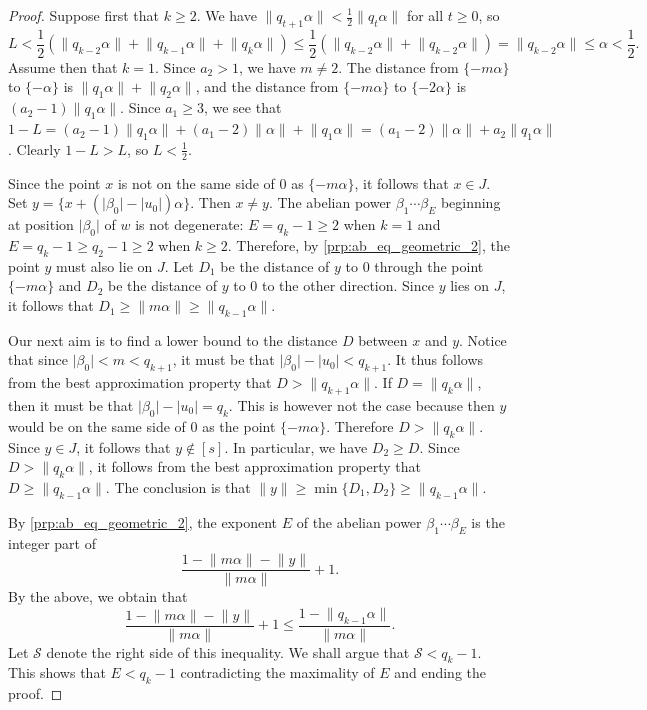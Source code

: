 \documentclass[a4paper,fleqn]{article}
\providecommand{\abs}[1]{\lvert#1\rvert}
\providecommand{\norm}[1]{\lVert#1\rVert}
\begin{document}
\begin{proof}
    Suppose first that $k \geq 2$. We have $\norm{q_{t+1}\alpha} < \tfrac12 \norm{q_t\alpha}$ for all $t \geq 0$, so
    \begin{equation*}
      L < \frac12(\norm{q_{k-2}\alpha} + \norm{q_{k-1}\alpha} + \norm{q_k\alpha}) \leq \frac12(\norm{q_{k-2}\alpha} + \norm{q_{k-2}\alpha}) = \norm{q_{k-2}\alpha} \leq \alpha < \frac12.
    \end{equation*}
    Assume then that $k = 1$. Since $a_2 > 1$, we have $m \neq 2$. The distance from $\{-m\alpha\}$ to $\{-\alpha\}$ is
    $\norm{q_1\alpha} + \norm{q_2\alpha}$, and the distance from $\{-m\alpha\}$ to $\{-2\alpha\}$ is
    $(a_2 - 1)\norm{q_1\alpha}$. Since $a_1 \geq 3$, we see that
    $1 - L = (a_2 - 1)\norm{q_1\alpha} + (a_1 - 2)\norm{\alpha} + \norm{q_1\alpha} = (a_1 - 2)\norm{\alpha} + a_2 \norm{q_1\alpha}$.
    Clearly $1 - L > L$, so $L < \tfrac12$.

    Since the point $x$ is not on the same side of $0$ as $\{-m\alpha\}$, it follows that $x \in J$. Set
    $y = \{x + (\abs{\beta_0} - \abs{u_0})\alpha\}$. Then $x \neq y$. The abelian power $\beta_1 \dotsm \beta_E$
    beginning at position $\abs{\beta_0}$ of $w$ is not degenerate: $E = q_k - 1 \geq 2$ when $k = 1$ and
    $E = q_k - 1 \geq q_2 - 1 \geq 2$ when $k \geq 2$. Therefore, by \autoref{prp:ab_eq_geometric_2}, the point $y$
    must also lie on $J$. Let $D_1$ be the distance of $y$ to $0$ through the point $\{-m\alpha\}$ and $D_2$ be the
    distance of $y$ to $0$ to the other direction. Since $y$ lies on $J$, it follows that
    $D_1 \geq \norm{m\alpha} \geq \norm{q_{k-1}\alpha}$.
    
    Our next aim is to find a lower bound to the distance $D$ between $x$ and $y$. Notice that since
    $\abs{\beta_0} < m < q_{k+1}$, it must be that $\abs{\beta_0} - \abs{u_0} < q_{k+1}$. It thus follows from the best
    approximation property that $D > \norm{q_{k+1}\alpha}$. If $D = \norm{q_k\alpha}$, then it must be that
    $\abs{\beta_0} - \abs{u_0} = q_k$. This is however not the case because then $y$ would be on the same side of
    $0$ as the point $\{-m\alpha\}$. Therefore $D > \norm{q_k\alpha}$. Since $y \in J$, it follows that $y \notin [s]$.
    In particular, we have $D_2 \geq D$. Since $D > \norm{q_k\alpha}$, it follows from the best approximation
    property that $D \geq \norm{q_{k-1}\alpha}$. The conclusion is that
    $\norm{y} \geq \min\{D_1, D_2\} \geq \norm{q_{k-1}\alpha}$.

    By \autoref{prp:ab_eq_geometric_2}, the exponent $E$ of the abelian power $\beta_1 \dotsm \beta_E$ is the integer
    part of
    \begin{equation*}
      \frac{1 - \norm{m\alpha} - \norm{y}}{\norm{m\alpha}} + 1.
    \end{equation*}
    By the above, we obtain that
    \begin{equation*}
      \frac{1 - \norm{m\alpha} - \norm{y}}{\norm{m\alpha}} + 1 \leq \frac{1 - \norm{q_{k-1}\alpha}}{\norm{m\alpha}}.
    \end{equation*}
    Let $\mathcal{S}$ denote the right side of this inequality. We shall argue that $\mathcal{S} < q_k - 1$. This shows
    that $E < q_k - 1$ contradicting the maximality of $E$ and ending the proof.


\end{proof}
\end{document}
